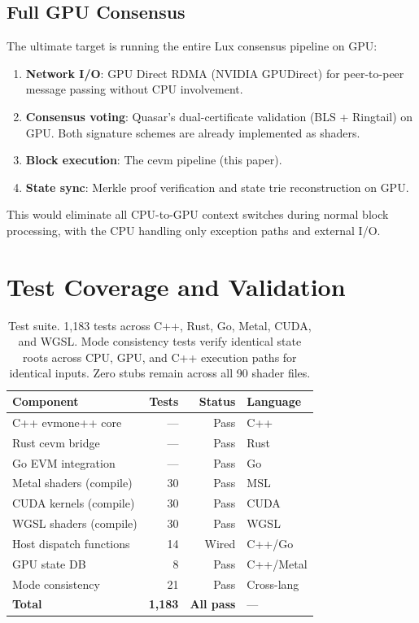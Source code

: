 \documentclass[11pt]{article}
\begin{document}
\subsection{Full GPU Consensus}

The ultimate target is running the entire Lux consensus pipeline on GPU:

\begin{enumerate}
\item \textbf{Network I/O}: GPU Direct RDMA (NVIDIA GPUDirect) for peer-to-peer message
      passing without CPU involvement.
\item \textbf{Consensus voting}: Quasar's dual-certificate validation (BLS + Ringtail)
      on GPU. Both signature schemes are already implemented as shaders.
\item \textbf{Block execution}: The cevm pipeline (this paper).
\item \textbf{State sync}: Merkle proof verification and state trie reconstruction on GPU.
\end{enumerate}

This would eliminate all CPU-to-GPU context switches during normal block processing,
with the CPU handling only exception paths and external I/O.

\section{Test Coverage and Validation}
\label{sec:tests}

\begin{table}[h]
\centering
\small
\begin{tabular}{lrrl}
\toprule
\textbf{Component} & \textbf{Tests} & \textbf{Status} & \textbf{Language} \\
\midrule
C++ evmone++ core        & ---  & Pass & C++ \\
Rust cevm bridge          & ---  & Pass & Rust \\
Go EVM integration        & ---  & Pass & Go \\
Metal shaders (compile)   & 30   & Pass & MSL \\
CUDA kernels (compile)    & 30   & Pass & CUDA \\
WGSL shaders (compile)    & 30   & Pass & WGSL \\
Host dispatch functions    & 14   & Wired & C++/Go \\
GPU state DB              & 8    & Pass & C++/Metal \\
Mode consistency          & 21   & Pass & Cross-lang \\
\midrule
\textbf{Total}            & \textbf{1{,}183} & \textbf{All pass} & --- \\
\bottomrule
\end{tabular}
\caption{Test suite. 1{,}183 tests across C++, Rust, Go, Metal, CUDA, and WGSL.
Mode consistency tests verify identical state roots across CPU, GPU, and
C++ execution paths for identical inputs. Zero stubs remain across all 90 shader files.}
\label{tab:tests}
\end{table}
\end{document}
